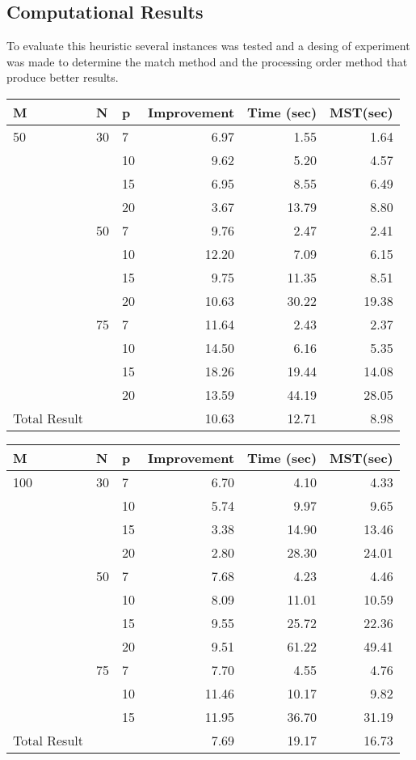 \subsection{Computational Results}
To evaluate this heuristic
several instances was tested
and
a desing of experiment was made
to determine
the match method
and the processing order method
that produce better results.

\begin{center}
  \begin{tabular}{|l|l|l|r|r|r|}
    \hline
    M & N & p & Improvement & Time (sec) & MST(sec) \\ \hline
    50 & 30 & 7 & 6.97 & 1.55 & 1.64 \\
    &  & 10 & 9.62 & 5.20 & 4.57 \\
    &  & 15 & 6.95 & 8.55 & 6.49 \\
    &  & 20 & 3.67 & 13.79 & 8.80 \\ \cline{2-6}
    & 50 & 7 & 9.76 & 2.47 & 2.41 \\
    &  & 10 & 12.20 & 7.09 & 6.15 \\
    &  & 15 & 9.75 & 11.35 & 8.51 \\
    &  & 20 & 10.63 & 30.22 & 19.38 \\ \cline{2-6}
    & 75 & 7 & 11.64 & 2.43 & 2.37 \\
    &  & 10 & 14.50 & 6.16 & 5.35 \\
    &  & 15 & 18.26 & 19.44 & 14.08 \\
    &  & 20 & 13.59 & 44.19 & 28.05 \\ \hline
    Total Result &  &  & 10.63 & 12.71 & 8.98 \\ 
    \hline
  \end{tabular}
\end{center}

\begin{center}
  \begin{tabular}{|l|l|l|r|r|r|}
    \hline
    M & N & p & Improvement & Time (sec) & MST(sec) \\ \hline
    100 & 30 & 7 & 6.70 & 4.10 & 4.33 \\
    &  & 10 & 5.74 & 9.97 & 9.65 \\
    &  & 15 & 3.38 & 14.90 & 13.46 \\
    &  & 20 & 2.80 & 28.30 & 24.01 \\ \cline{2-6}
    & 50 & 7 & 7.68 & 4.23 & 4.46 \\
    &  & 10 & 8.09 & 11.01 & 10.59 \\
    &  & 15 & 9.55 & 25.72 & 22.36 \\
    &  & 20 & 9.51 & 61.22 & 49.41 \\ \cline{2-6}
    & 75 & 7 & 7.70 & 4.55 & 4.76 \\
    &  & 10 & 11.46 & 10.17 & 9.82 \\
    &  & 15 & 11.95 & 36.70 & 31.19 \\ \hline
    Total Result &  &  & 7.69 & 19.17 & 16.73 \\ 
    \hline
  \end{tabular}
\end{center}

